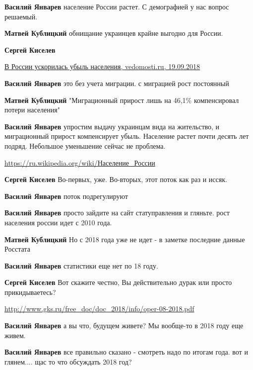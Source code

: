 \begin{itemize}
\begin{itemize}
\textbf{Василий Январев} население России растет. С демографией у нас вопрос решаемый.

\textbf{Матвей Кублицкий} обнищание украинцев крайне выгодно для России.

\textbf{Сергей Киселев} 

\href{https://www.vedomosti.ru/politics/articles/2018/09/19/781380-ubil}{%
В России ускорилась убыль населения, vedomosti.ru, 19.09.2018%
}

\textbf{Василий Январев} это без учета миграции. с миграцией рост постоянный

\textbf{Матвей Кублицкий} "Миграционный прирост лишь на 46,1\% компенсировал потери населения"

\textbf{Василий Январев} упростим выдачу украинцам вида на жительство, и миграционный прирост компенсирует убыль.
Население растет почти десять лет подряд. Небольшое уменьшение сейчас не проблема.

\url{https://ru.wikipedia.org/wiki/Население_России}

\textbf{Сергей Киселев} Во-первых, уже. Во-вторых, этот поток как раз и иссяк.

\textbf{Василий Январев} поток подрегулируют

\textbf{Василий Январев} просто зайдите на сайт статуправления и гляньте. рост населения россии идет с 2010 года.

\textbf{Матвей Кублицкий} Но с 2018 года уже не идет - в заметке последние данные Росстата

\textbf{Василий Январев} статистики еще нет по 18 году.

\textbf{Сергей Киселев} Вот скажите честно, Вы действительно дурак или просто прикидываетесь? 

\url{http://www.gks.ru/free_doc/doc_2018/info/oper-08-2018.pdf}

\textbf{Василий Январев} а вы что, будущем живете? Мы вообще-то в 2018 году еще живем.

\textbf{Василий Январев} все правильно сказано - смотреть надо по итогам года. вот и глянем.... щас то что обсуждать 2018 год?



\end{itemize}
\end{itemize}
